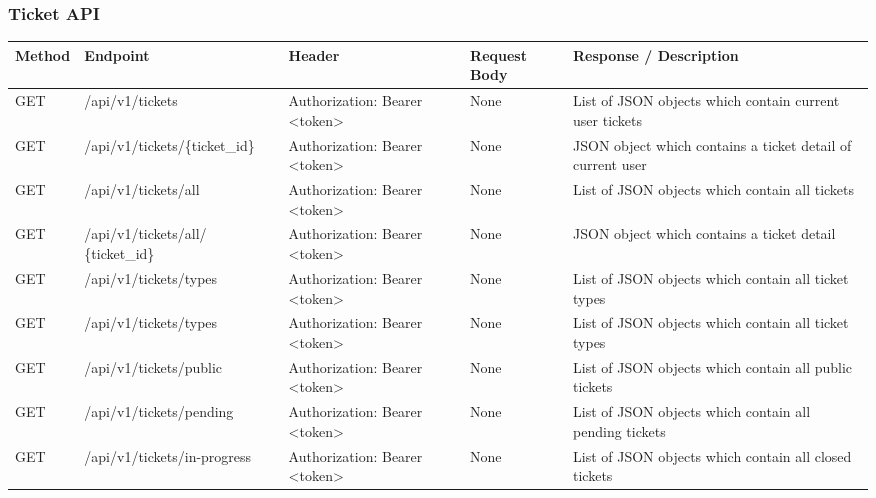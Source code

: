\subsubsection{Ticket API}
\begin{longtable}{|m{1.6cm}|m{5cm}|m{3cm}|m{3cm}|m{3.2cm}|}
	\hline
	\textbf{Method} & \textbf{Endpoint} & \textbf{Header}                                                                                                                            & \textbf{Request Body} & \textbf{Response / Description}   \\ \hline
	\endhead
	
	GET & /api/v1/tickets & Authorization: Bearer <token> & None & List of JSON objects which contain current user tickets \\ \hline
	
	GET & /api/v1/tickets/\{ticket\_id\} & Authorization: Bearer <token> & None  & JSON object which contains a ticket detail of current user\\ \hline
	
	GET & /api/v1/tickets/all & Authorization: Bearer <token> & None & List of JSON objects which contain all tickets \\ \hline
	
	GET & /api/v1/tickets/all/ \newline \{ticket\_id\} & Authorization: Bearer <token> & None & JSON object which contains a ticket detail \\ \hline
	
	
	GET & /api/v1/tickets/types & Authorization: Bearer <token> & None & List of JSON objects which contain all ticket types \\ \hline
	

	GET & /api/v1/tickets/types & Authorization: Bearer <token> & None & List of JSON objects which contain all ticket types \\ \hline
	
	GET & /api/v1/tickets/public & Authorization: Bearer <token> & None & List of JSON objects which contain all public tickets \\ \hline
	
	GET & /api/v1/tickets/pending & Authorization: Bearer <token> & None & List of JSON objects which contain all pending tickets \\ \hline
	
	GET & /api/v1/tickets/in-progress & Authorization: Bearer <token> & None & List of JSON objects which contain all closed tickets \\ \hline
	

\end{longtable}
